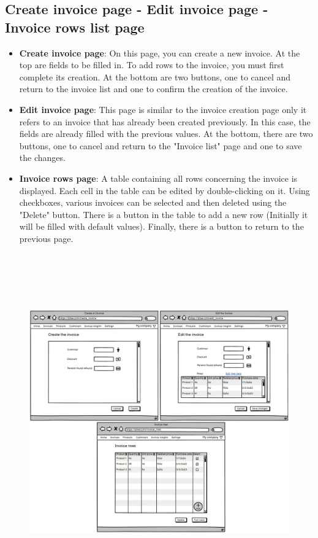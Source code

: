 \newpage
\subsection{Create invoice page - Edit invoice page - Invoice rows list page}

\begin{itemize}
    \item \textbf{Create invoice page}: On this page, you can create a new invoice. At the top are fields to be filled in. To add rows to the invoice, you must first complete its creation. At the bottom are two buttons, one to cancel and return to the invoice list and one to confirm the creation of the invoice.
    \item \textbf{Edit invoice page}: This page is similar to the invoice creation page only it refers to an invoice that has already been created previously. In this case, the fields are already filled with the previous values. At the bottom, there are two buttons, one to cancel and return to the "Invoice list" page and one to save the changes.
    \item \textbf{Invoice rows page}: A table containing all rows concerning the invoice is displayed. Each cell in the table can be edited by double-clicking on it. Using checkboxes, various invoices can be selected and then deleted using the "Delete" button. There is a button in the table to add a new row (Initially it will be filled with default values). Finally, there is a button to return to the previous page.
\end{itemize}

\begin{figure}[h!]
    \centering
    \includegraphics[height=410pt, keepaspectratio]{resources/mockup/Invoice.png}
\end{figure}


